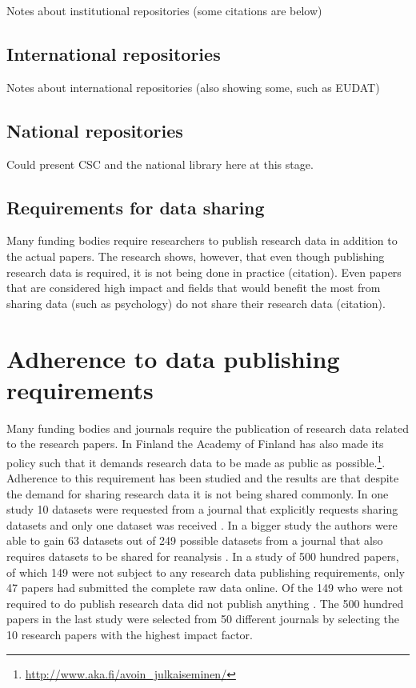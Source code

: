 Notes about institutional repositories (some citations are below)

\subsection{International repositories}

Notes about international repositories (also showing some, such as EUDAT)

\subsection{National repositories}

Could present CSC and the national library here at this stage.

\subsection{Requirements for data sharing}

Many funding bodies require researchers to publish research data in addition
to the actual papers. The research shows, however, that even though publishing
research data is required, it is not being done in practice (citation). Even
papers that are considered high impact and fields that would benefit the most
from sharing data (such as psychology) do not share their research data
(citation).

\fi

\section{Adherence to data publishing requirements}

Many funding bodies and journals require the publication of research data
related to the research papers. In Finland the Academy of Finland has also made
its policy such that it demands research data to be made as public as
possible.\footnote{\url{http://www.aka.fi/avoin\_julkaiseminen/}}.
Adherence to this requirement has been studied
and the results are that despite the demand for sharing research data it is not
being shared commonly. In one study 10 datasets were requested from a journal
that explicitly requests sharing datasets and only one dataset was received
\cite{savage2009empirical}. In a bigger study the authors were able to gain
63 datasets out of 249 possible datasets from a journal that also requires
datasets to be shared for reanalysis \cite{wicherts2006poor}. In a study of
500 hundred papers, of which 149 were not subject to any research data
publishing requirements, only 47 papers had submitted the complete raw data
online. Of the 149 who were not required to do publish research data did not
publish anything \cite{alsheikh2011public}. The 500 hundred papers in the last
study were selected from 50 different journals by selecting the 10 research
papers with the highest impact factor.

